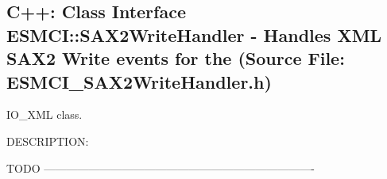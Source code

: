  
\setlength{\oldparskip}{\parskip}
\setlength{\parskip}{1.5ex}
\setlength{\oldparindent}{\parindent}
\setlength{\parindent}{0pt}
\setlength{\oldbaselineskip}{\baselineskip}
\setlength{\baselineskip}{11pt}
 
\def\bv{\begin{verbatim}}
\def\ev{\end{verbatim}}
\def\be{\begin{equation}}
\def\ee{\end{equation}}
\def\bea{\begin{eqnarray}}
\def\eea{\end{eqnarray}}
\def\bi{\begin{itemize}}
\def\ei{\end{itemize}}
\def\bn{\begin{enumerate}}
\def\en{\end{enumerate}}
\def\bd{\begin{description}}
\def\ed{\end{description}}
\def\({\left (}
\def\){\right )}
\def\[{\left [}
\def\]{\right ]}
\def\<{\left  \langle}
\def\>{\right \rangle}
\def\cI{{\cal I}}
\def\diag{\mathop{\rm diag}}
\def\tr{\mathop{\rm tr}}


 
\subsection{C++:  Class Interface ESMCI::SAX2WriteHandler - Handles XML SAX2 Write events for the (Source File: ESMCI\_SAX2WriteHandler.h)}


   IO_XML class.
  
{\sf DESCRIPTION:\\ }


    TODO
  -------------------------------------------------------------------------
  
